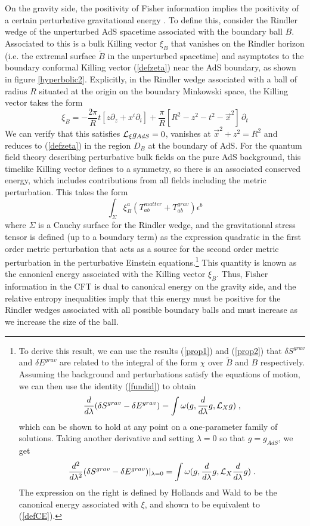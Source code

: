 \documentclass[12pt,epsf]{article}
\newcommand{\be}{\begin{equation}}
\newcommand{\ee}{\end{equation}}
\begin{document}
On the gravity side, the positivity of Fisher information implies the positivity of a certain perturbative gravitational energy \cite{Lashkari:2015hha}. To define this, consider the Rindler wedge of the unperturbed AdS spacetime associated with the boundary ball $B$. Associated to this is a bulk Killing vector $\xi_B$ that vanishes on the Rindler horizon (i.e. the extremal surface $\tilde{B}$ in the unperturbed spacetime) and asymptotes to the boundary conformal Killing vector (\ref{defzeta}) near the AdS boundary, as shown in figure \ref{hyperbolic2}. Explicitly, in the Rindler wedge associated with a ball of radius $R$ situated at the origin on the boundary Minkowski space, the Killing vector takes the form
\be
\label{defxi}
\xi_B  = - \frac{2\pi}{ R}  t [z \partial_z + x^i \partial_i ] + \frac{\pi}{R} [R^2 - z^2 - t^2 - \vec{x}^2] \, \partial_t
\ee
We can verify that this satisfies ${\cal L}_\xi g_{AdS} = 0$, vanishes at $\vec{x}^2 + z^2 = R^2$ and reduces to (\ref{defzeta}) in the region $D_B$ at the boundary of AdS.  For the quantum field theory describing perturbative bulk fields on the pure AdS background, this timelike Killing vector defines to a symmetry, so there is an associated conserved energy, which includes contributions from all fields including the metric perturbation. This takes the form
\be
\label{defCE}
\int_\Sigma \xi_B^a (T^{matter}_{ab} + T^{grav}_{ab}) \epsilon^b
\ee
where $\Sigma$ is a Cauchy surface for the Rindler wedge, and the gravitational stress tensor is defined (up to a boundary term) as the expression quadratic in the first order metric perturbation that acts as a source for the second order metric perturbation in the perturbative Einstein equations.\footnote{To derive this result, we can use the results (\ref{prop1}) and (\ref{prop2}) that $\delta S^{grav}$ and $\delta E^{grav}$ are related to the integral of the form $\chi$ over $\tilde{B}$ and $B$ respectively. Assuming the background and perturbations satisfy the equations of motion, we can then use the identity (\ref{fundid}) to obtain
\be
{d \over d \lambda} (\delta S^{grav} - \delta E^{grav}) = \int \omega(g, {d \over d \lambda} g, {\cal L}_X g) \; ,
\ee
which can be shown to hold at any point on a one-parameter family of solutions. Taking another derivative and setting $\lambda = 0$ so that $g = g_{AdS}$, we get
\be
{d^2 \over d \lambda^2} (\delta S^{grav} - \delta E^{grav})|_{\lambda = 0} = \int \omega(g, {d \over d \lambda} g, {\cal L}_X {d \over d \lambda} g) \; .
\ee
The expression on the right is defined by Hollands and Wald \cite{hollands2013stability} to be the canonical energy associated with $\xi$, and shown to be equivalent to (\ref{defCE}).
}
This quantity is known as the canonical energy associated with the Killing vector $\xi_B$. Thus, Fisher information in the CFT is dual to canonical energy on the gravity side, and the relative entropy inequalities imply that this energy must be positive for the Rindler wedges associated with all possible boundary balls and must increase as we increase the size of the ball.
\end{document}
